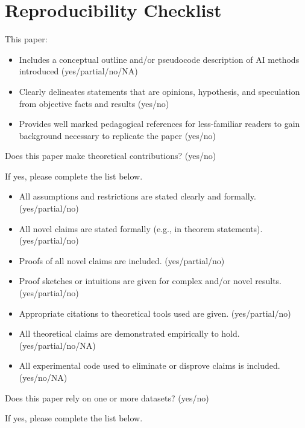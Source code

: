 
\section{Reproducibility Checklist}
This paper:

\begin{itemize}
    \item Includes a conceptual outline and/or pseudocode description of AI methods introduced (yes/partial/no/NA)
    \item Clearly delineates statements that are opinions, hypothesis, and speculation from objective facts and results (yes/no)
    \item Provides well marked pedagogical references for less-familiar readers to gain background necessary to replicate the paper (yes/no)

\end{itemize}

Does this paper make theoretical contributions? (yes/no)

If yes, please complete the list below.

\begin{itemize}
    \item   All assumptions and restrictions are stated clearly and formally. (yes/partial/no)
    \item All novel claims are stated formally (e.g., in theorem statements). (yes/partial/no)
    \item Proofs of all novel claims are included. (yes/partial/no)
    \item Proof sketches or intuitions are given for complex and/or novel results. (yes/partial/no)
    \item Appropriate citations to theoretical tools used are given. (yes/partial/no)
    \item All theoretical claims are demonstrated empirically to hold. (yes/partial/no/NA)
    \item All experimental code used to eliminate or disprove claims is included. (yes/no/NA)
\end{itemize}

Does this paper rely on one or more datasets? (yes/no)

If yes, please complete the list below.

